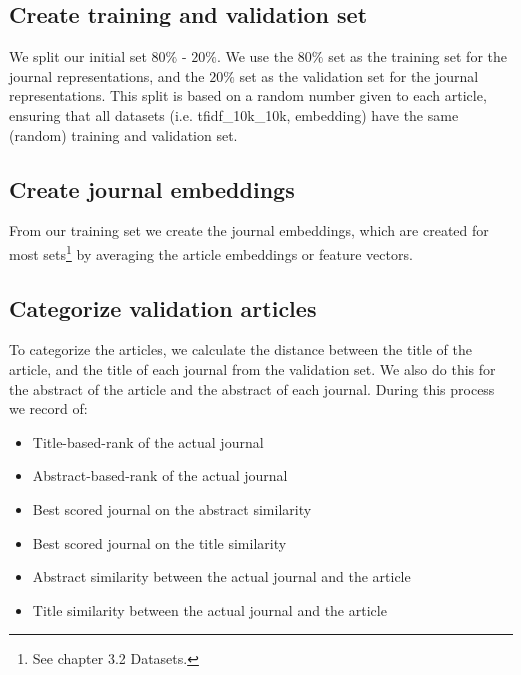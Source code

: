 \documentclass[../../Thesis.tex]{subfiles}
\begin{document}
\subsection{Create training and validation set}
We split our initial set  $80\%$ - $20\%$. We use the $80\%$ set as the training set for the journal representations, and the $20\%$ set as the validation set for the journal representations. This split is based on a random number given to each article, ensuring that all datasets (i.e. tfidf\_10k\_10k, embedding) have the same (random) training and validation set.
\subsection{Create journal embeddings}
From our training set we create the journal embeddings, which are created for most sets\footnote{See chapter 3.2 Datasets.} by averaging the article embeddings or feature vectors.
\subsection{Categorize validation articles}
To categorize the articles, we calculate the distance between the title of the article, and the title of each journal from the validation set. We also do this for the abstract of the article and the abstract of each journal. During this process we record of:
\begin{itemize}
\item{Title-based-rank of the actual journal}
\item{Abstract-based-rank of the actual journal}
\item{Best scored journal on the abstract similarity}
\item{Best scored journal on the title similarity}
\item{Abstract similarity between the actual journal and the article}
\item{Title similarity between the actual journal and the article}
\end{itemize}
\end{document}
